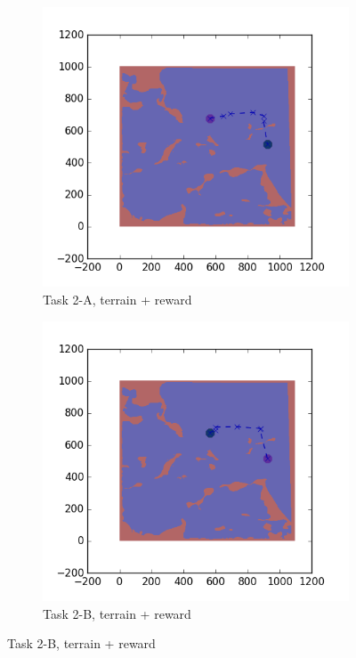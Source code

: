 \documentclass{tamuccthesis}
\begin{document}
\begin{figure}
    \begin{subfigure}[b]{0.4\textwidth}
        \centering
        \includegraphics[width=\textwidth,trim={4cm 3cm 2cm 3cm},clip]{EXP3RG_PathBa_-1_-1_0_-1.png}
        \caption[]{{\small Task 2-A, terrain + reward}}    
        \label{fig:Path_2-A_terrain_reward}
    \end{subfigure}
    \hfill
    \begin{subfigure}[b]{0.4\textwidth}  
        \centering 
        \includegraphics[width=\textwidth,trim={4cm 3cm 2cm 3cm},clip]{EXP3RG_PathBb_-1_-1_0_-1.png}
        \caption[]{{\small Task 2-B, terrain + reward}}   
        \label{fig:Path_2-B_terrain_reward}
    \end{subfigure}
    

\end{figure}
\end{document}
